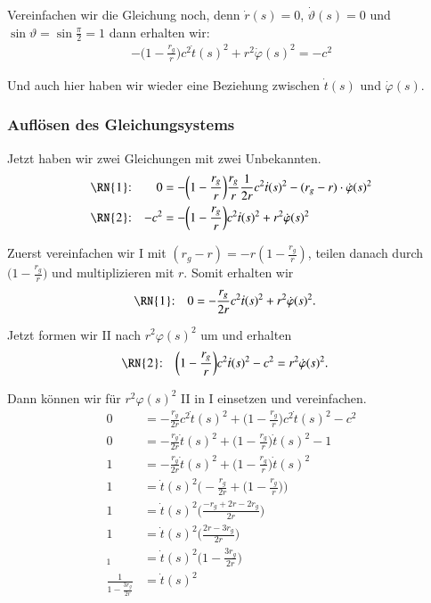 \begin{refsection}
\noindent{}Vereinfachen wir die Gleichung noch, denn \( \dot r(s) = 0 \), \( \dot \vartheta(s) = 0 \) und \( \sin \vartheta = \sin \frac{\pi}{2} = 1 \) dann erhalten wir:
\begin{align*}
-\biggl(1-\frac{r_g}r\biggr)c^2 \dot t(s)^2 + r^2  \dot \varphi (s)^2 = -c^2 
\end{align*}

\noindent{}Und auch hier haben wir wieder eine Beziehung zwischen \( \dot t(s) \) und \( \dot \varphi(s) \). 

\subsubsection{Auflösen des Gleichungsystems}
Jetzt haben wir zwei Gleichungen mit zwei Unbekannten.
\begin{align*}
\text{\RN{1}:} &&
0 &= -\biggl(1-\frac{r_g}{r}\biggr)\frac{r_g}{r}\frac1{2r}c^2\dot t(s)^2 - (r_g-r)\cdot \dot \varphi(s)^2
\\
\text{\RN{2}:} &&
-c^2 &= -\biggl(1-\frac{r_g}r\biggr)c^2 \dot t(s)^2 + r^2 \dot \varphi (s)^2
\end{align*}

\noindent{}Zuerst vereinfachen wir \RN{1} mit $ (r_g - r) = -r (1 - \frac{r_g}{r} )$, teilen danach durch $\biggr( 1 - \frac{r_g}{r} \biggr)$ und multiplizieren mit $r$. Somit erhalten wir
\begin{align*}
\text{\RN{1}:} && 0 &= -\frac{r_g}{2r} c^2 \dot t(s)^2 + r^2 \dot \varphi(s)^2.
\end{align*}

\noindent{}Jetzt formen wir \RN{2} nach $ r^2 \varphi(s)^2$ um und erhalten 
\begin{align*}
\text{\RN{2}:} && \biggr( 1 - \frac{r_g}{r} \biggr) c^2 \dot t(s)^2 - c^2 &= r^2 \dot \varphi (s)^2.
\end{align*}

\noindent{}Dann können wir für $ r^2 \varphi(s)^2$ \RN{2} in \RN{1} einsetzen und vereinfachen.
\begin{align*}
0 &= -\frac{r_g}{2r} c^2 \dot t(s)^2 + \biggr( 1 - \frac{r_g}{r} \biggr) c^2 \dot t(s)^2 - c^2  
\\
0 &= -\frac{r_g}{2r}\dot t(s)^2 + \biggr( 1 - \frac{r_g}{r} \biggr) \dot t(s)^2 - 1 
\\
1 &= -\frac{r_g}{2r}\dot t(s)^2 + \biggr( 1 - \frac{r_g}{r} \biggr) \dot t(s)^2
\\
1 &= \dot t(s)^2 \biggr( -\frac{r_g}{2r} + \biggr( 1 - \frac{r_g}{r} \biggr) \biggr) 
\\
1 &= \dot t(s)^2 \biggr( \frac{-r_g + 2r - 2r_g}{2r}\biggr)
\\
1 &= \dot t(s)^2 \biggr( \frac{2r-3r_g}{2r}\biggr)
\\_
1 &= \dot t(s)^2 \biggr( 1 - \frac{3r_g}{2r}\biggr) 
\\
\frac{1}{ 1 - \frac{3r_g}{2r} } &= \dot t(s)^2 
\end{align*}


\end{refsection}
